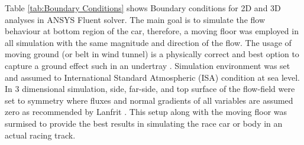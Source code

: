 \noindent Table \ref{tab:Boundary Conditions} shows Boundary conditions for 2D and 3D analyses in ANSYS Fluent solver. The main goal is to simulate the flow behaviour at bottom region of the car, therefore, a moving floor was employed in all simulation with the same magnitude and direction of the flow. The usage of moving ground (or belt in wind tunnel) is a physically correct and best option to capture a ground effect such in an undertray \cite{Zhang2006GroundCars}\cite{Burgin1986WINDEFFECT}. Simulation environment was set and assumed to International Standard Atmospheric (ISA) condition at sea level. 
\vspace{1cm}
\noindent In 3 dimensional simulation, side, far-side, and top surface of the flow-field were set to symmetry where fluxes and normal gradients of all variables are assumed zero \cite{ANSYS2009SymmetryConditions} as recommended by Lanfrit \cite{Lanfrit2005BestFLUENT}. This setup along with the moving floor was surmised to provide the best results in simulating the race car or body in an actual racing track.





